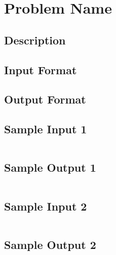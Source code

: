

\section{Problem Name}

\subsection*{Description}

\subsection*{Input Format}

\subsection*{Output Format}

\subsection*{Sample Input 1}
\begin{verbatim}
\end{verbatim}

\subsection*{Sample Output 1}
\begin{verbatim}
\end{verbatim}

\subsection*{Sample Input 2}
\begin{verbatim}
\end{verbatim}

\subsection*{Sample Output 2}
\begin{verbatim}
\end{verbatim}


\newpage



